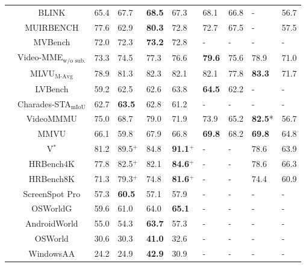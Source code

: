 {\begin{table}[htp]
\begin{adjustbox}{max width=1\textwidth}
\begin{NiceTabular}{c|c|w{c}{1cm}w{c}{1cm}|w{c}{1cm}w{c}{1cm}|w{c}{1cm}w{c}{1cm}|w{c}{1cm}w{c}{1cm}}
\midrule
{}
&BLINK & 65.4 & 67.7 & \textbf{68.5} & 67.3 & 68.1 & 66.8 & -    & 56.7 \\
&MUIRBENCH & 77.6 & 62.9 & \textbf{80.3} & 72.8 & 72.7 & 67.5 & -    & 57.5 \\ 
\midrule
{}
&MVBench & 72.0 & 72.3 & \textbf{73.2} & 72.8 & -    & -    & -    & -    \\
&Video-MME$_{\text{w/o sub.}}$  & 73.3 & 74.5 & 77.3 & 76.6 & \textbf{79.6} & 75.6 & 78.9 & 71.0 \\
&MLVU$_{\text{M-Avg}}$ & 78.9 & 81.3 & 82.3 & 82.1 & 82.1 & 77.8 & \textbf{83.3} & 71.7 \\
&LVBench & 59.2 & 62.5 & 62.6 & 63.8 & \textbf{64.5}    & 62.2 & - & -    \\
&Charades-STA$_{\text{mIoU}}$   & 62.7 & \textbf{63.5} & 62.8 & 61.2 & -    & -    & -    & -    \\
&VideoMMMU & 75.0 & 68.7 & 79.0 & 71.9 & 73.9 & 65.2    & \textbf{82.5}* & 56.7 \\
&MMVU & 66.1 & 59.8 & 67.9 & 66.8 & \textbf{69.8} & 68.2 & \textbf{69.8} & 64.8 \\
\midrule
{}
&V$^*$ & 81.2 & 89.5$^+$ & 84.8 & \textbf{91.1$^+$} & -    & -    & 78.6 & 63.9 \\  
&HRBench4K  & 77.8 & 82.5$^+$ & 82.1 & \textbf{84.6$^+$} & -    & -    & 78.6 & 66.3 \\
&HRBench8K & 71.3 & 79.3$^+$ & 74.8 & \textbf{81.6$^+$} & -    & -    & 74.4 & 60.9 \\
\midrule
{}
&ScreenSpot Pro  & 57.3 & \textbf{60.5} & 57.1 & 57.9 & -    & -    & -    & -    \\
&OSWorldG & 59.6 & 61.0 & 64.0 & \textbf{65.1} & -    & -    & -    & -    \\
&AndroidWorld & 55.0 & 54.3 & \textbf{63.7} & 57.3 & -    & -    & -    & -    \\
&OSWorld & 30.6 & 30.3 & \textbf{41.0} & 32.6 & -    & -    & -    & -    \\
&WindowsAA & 24.2 & 24.9 & \textbf{42.9} & 30.9 & -    & -    & -    & -    \\
\bottomrule
\end{NiceTabular}
\end{adjustbox}
\renewcommand{\arraystretch}{1.0} 
\end{table}
}